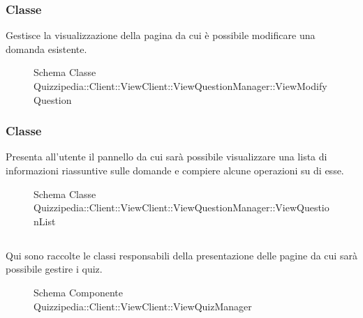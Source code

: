 \subsubsection{Classe }
Gestisce la visualizzazione della pagina da cui è possibile modificare una domanda esistente.
\begin{figure}[H]
\centering
\noindent{}
\caption[Schema Classe ViewModifyQuestion]{Schema Classe Quizzipedia::Client::ViewClient::ViewQuestionManager::ViewModifyQuestion}
\end{figure}
\subsubsection{Classe }
Presenta all'utente il pannello da cui sarà possibile visualizzare una lista di informazioni riassuntive sulle domande e compiere alcune operazioni su di esse.
\begin{figure}[H]
\centering
\noindent{}
\caption[Schema Classe ViewQuestionList]{Schema Classe Quizzipedia::Client::ViewClient::ViewQuestionManager::ViewQuestionList}
\end{figure}
\subsection{}
Qui sono raccolte le classi responsabili della presentazione delle pagine da cui sarà possibile gestire i quiz.
\begin{figure}[H]
\centering
\noindent{}
\caption[Schema Componente Quizzipedia::Client::ViewClient::ViewQuizManager]{Schema Componente Quizzipedia::Client::ViewClient::ViewQuizManager}
\end{figure}
